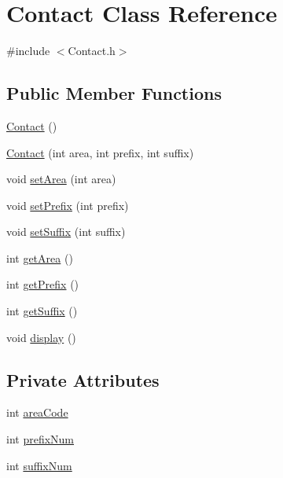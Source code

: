 \hypertarget{classContact}{\section{Contact Class Reference}
\label{classContact}
}


{\ttfamily \#include $<$Contact.\+h$>$}

\subsection*{Public Member Functions}
\begin{DoxyCompactItemize}
\item 
\hyperlink{classContact_ae39444f378e6de7fd6c3e60981949af5}{Contact} ()
\item 
\hyperlink{classContact_a90c224b7814afe056da1a339eeab928a}{Contact} (int area, int prefix, int suffix)
\item 
void \hyperlink{classContact_a531320e14eaa9bebf67d46fe97e46f9f}{set\+Area} (int area)
\item 
void \hyperlink{classContact_a172dccd347efe81bc7c844a0bb24502f}{set\+Prefix} (int prefix)
\item 
void \hyperlink{classContact_a0e762158350dfc8b22e9446d2820c05b}{set\+Suffix} (int suffix)
\item 
int \hyperlink{classContact_ad8ad13da697275f7243a21132f4d7224}{get\+Area} ()
\item 
int \hyperlink{classContact_afb68a34353910b2a7fb012f2c3c665c6}{get\+Prefix} ()
\item 
int \hyperlink{classContact_a36b4490ede1fe1114c25ecd68ba29ab1}{get\+Suffix} ()
\item 
void \hyperlink{classContact_a1a7b491fba3111a679bfae344d75d19d}{display} ()
\end{DoxyCompactItemize}
\subsection*{Private Attributes}
\begin{DoxyCompactItemize}
\item 
int \hyperlink{classContact_a9982efa21fdf3aa80ecb27fca50c1112}{area\+Code}
\item 
int \hyperlink{classContact_af88818b83e23babeeaccadbd957c5b3a}{prefix\+Num}
\item 
int \hyperlink{classContact_a741fc49c27f513429795c99b07bceae1}{suffix\+Num}
\end{DoxyCompactItemize}


